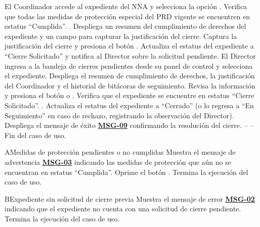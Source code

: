 \begin{UCtrayectoria}
	\UCpaso[\UCactor] El Coordinador accede al expediente del NNA y selecciona la opción .
	\UCpaso Verifica que todas las medidas de protección especial del PRD vigente se encuentren en estatus ``Cumplida''. .
	\UCpaso Despliega un resumen del cumplimiento de derechos del expediente y un campo para capturar la justificación del cierre.
	\UCpaso[\UCactor] Captura la justificación del cierre y presiona el botón .
	\UCpaso Actualiza el estatus del expediente a ``Cierre Solicitado'' y notifica al Director sobre la solicitud pendiente.
	\UCpaso[\UCactor] El Director ingresa a la bandeja de cierres pendientes desde su panel de control y selecciona el expediente.
	\UCpaso Despliega el resumen de cumplimiento de derechos, la justificación del Coordinador y el historial de bitácoras de seguimiento.
	\UCpaso[\UCactor] Revisa la información y presiona el botón  o .
	\UCpaso Verifica que el expediente se encuentre en estatus ``Cierre Solicitado''. .
	\UCpaso Actualiza el estatus del expediente a ``Cerrado'' (o lo regresa a ``En Seguimiento'' en caso de rechazo, registrando la observación del Director).
	\UCpaso Despliega el mensaje de éxito \hyperlink{mMSG09}{\bf MSG-09} confirmando la resolución del cierre.
	\UCpaso[] -- -- Fin del caso de uso.
\end{UCtrayectoria}

\begin{UCtrayectoriaA}{A}{Medidas de protección pendientes o no cumplidas}
	\UCpaso Muestra el mensaje de advertencia \hyperlink{mMSG03}{\bf MSG-03} indicando las medidas de protección que aún no se encuentran en estatus ``Cumplida''.
	\UCpaso[\UCactor] Oprime el botón .
	\UCpaso Termina la ejecución del caso de uso.
\end{UCtrayectoriaA}

\begin{UCtrayectoriaA}{B}{Expediente sin solicitud de cierre previa}
	\UCpaso Muestra el mensaje de error \hyperlink{mMSG02}{\bf MSG-02} indicando que el expediente no cuenta con una solicitud de cierre pendiente.
	\UCpaso Termina la ejecución del caso de uso.
\end{UCtrayectoriaA}
